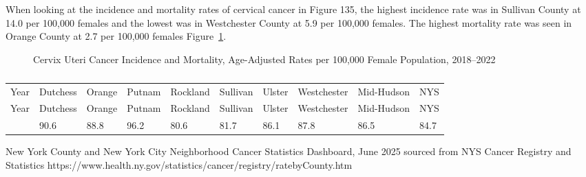 \documentclass[
  english,
  letterpaper,
]{report}
\begin{document}
When looking at the incidence and mortality rates of cervical cancer in
Figure 135, the highest incidence rate was in Sullivan County at 14.0
per 100,000 females and the lowest was in Westchester County at 5.9 per
100,000 females. The highest mortality rate was seen in Orange County at
2.7 per 100,000 females Figure~\ref{fig-cervutca-incident-mortal-aar}.

\begin{figure}


\caption{\label{fig-cervutca-incident-mortal-aar}Cervix Uteri Cancer
Incidence and Mortality, Age-Adjusted Rates per 100,000 Female
Population, 2018--2022}

\end{figure}%

\begin{longtable}[]{@{}llllllllll@{}}

\caption{\label{tbl-cervutca-incident-mortal-aar}Cervix Uteri Cancer
Incidence and Mortality, Age-Adjusted Rates per 100,000 Female
Population, 2018--2022}

\tabularnewline

\caption{}\label{T_dbcad}\tabularnewline
\toprule\noalign{}
Year & Dutchess & Orange & Putnam & Rockland & Sullivan & Ulster &
Westchester & Mid-Hudson & NYS \\
\midrule\noalign{}
\endfirsthead
\toprule\noalign{}
Year & Dutchess & Orange & Putnam & Rockland & Sullivan & Ulster &
Westchester & Mid-Hudson & NYS \\
\midrule\noalign{}
\endhead
\bottomrule\noalign{}
\endlastfoot
2018 & 90.6 & 88.8 & 96.2 & 80.6 & 81.7 & 86.1 & 87.8 & 86.5 & 84.7 \\

\end{longtable}

\begin{tcolorbox}[enhanced jigsaw, breakable, leftrule=.75mm, title=\textcolor{quarto-callout-note-color}{\faInfo}\hspace{0.5em}{Source}, bottomrule=.15mm, opacityback=0, left=2mm, colback=white, bottomtitle=1mm, coltitle=black, colbacktitle=quarto-callout-note-color!10!white, colframe=quarto-callout-note-color-frame, opacitybacktitle=0.6, toptitle=1mm, titlerule=0mm, arc=.35mm, rightrule=.15mm, toprule=.15mm]

New York County and New York City Neighborhood Cancer Statistics
Dashboard, June 2025 sourced from NYS Cancer Registry and Statistics
https://www.health.ny.gov/statistics/cancer/registry/ratebyCounty.htm

\end{tcolorbox}
\end{document}

